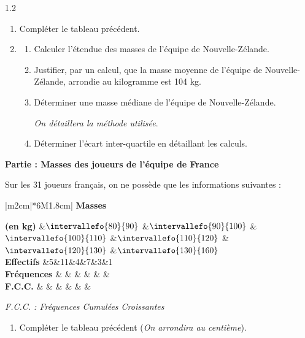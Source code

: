 \documentclass[12pt,french,oneside]{report}
\begin{document}
\begin{spacing}{1.2}
\begin{Exercice}[(10,5 points)]
\begin{enumerate}
\item Compléter le tableau précédent.

\item 	\begin{enumerate}
	\item Calculer l'étendue des masses de l'équipe de Nouvelle-Zélande.

	\item Justifier, par un calcul, que la masse moyenne de l'équipe de Nouvelle-Zélande, arrondie au kilogramme est 104 kg.
	
	\item Déterminer une masse médiane de l'équipe de Nouvelle-Zélande. 
	
	\textit{On détaillera la méthode utilisée}.
	
	\item Déterminer l'écart inter-quartile en détaillant les calculs.
	
	\end{enumerate}

\end{enumerate}

\textbf{Partie  : Masses des joueurs de l'équipe de France}

Sur les 31 joueurs français, on ne possède que les informations suivantes :

\boldmath
\begin{center}
\begin{tabular}{|m{2cm}|*{6}{M{1.8cm}|}}
\hline
{}\textbf{Masses}\par \textbf{(en kg)}
&$\intervallefo{80}{90}$
&$\intervallefo{90}{100}$
&$\intervallefo{100}{110}$
&$\intervallefo{110}{120}$
&$\intervallefo{120}{130}$
&$\intervallefo{130}{160}$
\\
\hline
{}\textbf{Effectifs}
&5&11&4&7&3&1\\
\hline
{}\textbf{Fréquences}
& & & & & & \\
\hline
{}\textbf{F.C.C.}
& & & & & & \\
\hline
\end{tabular}
\end{center}
\unboldmath

\textit{F.C.C. : Fréquences Cumulées Croissantes}

\begin{enumerate}
\item Compléter le tableau précédent (\textit{On arrondira au centième}).


\end{enumerate}
\end{Exercice}
\end{spacing}
\end{document}
